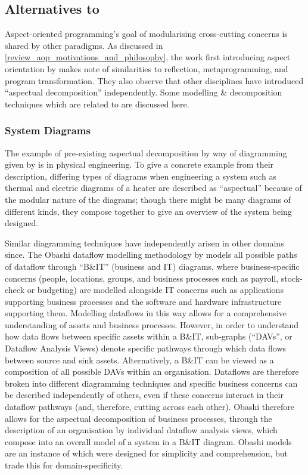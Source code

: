\subsection{Alternatives to \AspectOrientation{}}

Aspect-oriented programming's goal of modularising cross-cutting concerns is
shared by other paradigms. As discussed in
\cref{review_aop_motivations_and_philosophy}, the work first introducing aspect
orientation by \citet{kiczales1997aspect} makes note of similarities to
reflection, metaprogramming, and program transformation. They also observe that
other disciplines have introduced ``aspectual decomposition'' independently.
Some modelling \& decomposition techniques which are related to
\aspectorientation{} are discussed here.


\subsubsection{System Diagrams}\label{subsec:system_diagrams_as_aspects}

The example of pre-existing aspectual decomposition by way of diagramming given
by \citet{kiczales1997aspect} is in physical engineering. To give a concrete
example from their description, differing types of diagrams when engineering a
system such as thermal and electric diagrams of a heater are described as
``aspectual'' because of the modular nature of the diagrams; though there might
be many diagrams of different kinds, they compose together to give an overview
of the system being designed.

Similar diagramming techniques have independently arisen in other domains since.
The Obashi dataflow modelling methodology\cite{obashimethodology} by
\citeauthor{obashimethodology} models all possible paths of dataflow through
``B\&IT'' (business and IT) diagrams, where business-specific concerns (people,
locations, groups, and business processes such as payroll, stock-check or
budgeting) are modelled alongside IT concerns such as applications supporting
business processes and the software and hardware infrastructure supporting them.
Modelling dataflows in this way allows for a comprehensive understanding of
assets and business processes. However, in order to understand how data flows
between specific assets within a B\&IT, sub-graphs (``DAVs'', or Dataflow
Analysis Views) denote specific pathways through which data flows between source
and sink assets. Alternatively, a B\&IT can be viewed as a composition of all
possible DAVs within an organisation. Dataflows are therefore broken into
different diagramming techniques and specific business concerns can be described
independently of others, even if these concerns interact in their dataflow
pathways (and, therefore, cutting across each other). Obashi therefore allows
for the aspectual decomposition of business processes, through the description
of an organisation by individual dataflow analysis views, which compose into an
overall model of a system in a B\&IT diagram. Obashi models are an instance of
\aspectorientation{} which were designed for simplicity and
comprehension\cite{obashimethodology,seow2011obashi}, but trade this for
domain-specificity.

